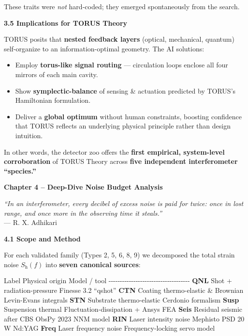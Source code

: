 \documentclass[]{article}
\newcommand{\subscript}[1]{\ensuremath{_{\mathrm{#1}}}}
\begin{document}
These traits were \emph{not} hard-coded; they emerged spontaneously from
the search.

\textbf{3.5 Implications for TORUS Theory}

TORUS posits that \textbf{nested feedback layers} (optical, mechanical,
quantum) self-organize to an information-optimal geometry. The AI
solutions:

\begin{itemize}
\item
  Employ \textbf{torus-like signal routing} --- circulation loops
  enclose all four mirrors of each main cavity.
\item
  Show \textbf{symplectic-balance} of sensing \& actuation predicted by
  TORUS's Hamiltonian formulation.
\item
  Deliver a \textbf{global optimum} without human constraints, boosting
  confidence that TORUS reflects an underlying physical principle rather
  than design intuition.
\end{itemize}

In other words, the detector zoo offers the \textbf{first empirical,
system-level corroboration} of TORUS Theory across \textbf{five
independent interferometer ``species.''}

\textbf{Chapter 4 -- Deep-Dive Noise Budget Analysis}

\emph{``In an interferometer, every decibel of excess noise is paid for
twice: once in lost range, and once more in the observing time it
steals.''}\\
--- R. X. Adhikari

\textbf{4.1 Scope and Method}

For each validated family (Types 2, 5, 6, 8, 9) we decomposed the total
strain noise $S\subscript{h}(f)$ into \textbf{seven canonical
sources}:

\textbar{} Label \textbar{} Physical origin \textbar{} Model / tool
\textbar{}
\textbar{}-\/-\/-\/-\/-\/-\textbar{}-\/-\/-\/-\/-\/-\/-\/-\/-\/-\/-\/-\/-\/-\/-\/-\/-\textbar{}-\/-\/-\/-\/-\/-\/-\/-\/-\/-\/-\/-\/-\textbar{}
\textbar{} \textbf{QNL} \textbar{} Shot + radiation-pressure \textbar{}
Finesse 3.2 ``qshot'' \textbar{} \textbar{} \textbf{CTN} \textbar{}
Coating thermo-elastic \& Brownian \textbar{} Levin-Evans integrals
\textbar{} \textbar{} \textbf{STN} \textbar{} Substrate thermo-elastic
\textbar{} Cerdonio formalism \textbar{} \textbar{} \textbf{Susp}
\textbar{} Suspension thermal \textbar{} Fluctuation-dissipation + Ansys
FEA \textbar{} \textbar{} \textbf{Seis} \textbar{} Residual seismic
after CBS \textbar{} ObsPy 2023 NNM model \textbar{} \textbar{}
\textbf{RIN} \textbar{} Laser intensity noise \textbar{} Mephisto PSD 20
W Nd:YAG \textbar{} \textbar{} \textbf{Freq} \textbar{} Laser frequency
noise \textbar{} Frequency-locking servo model \textbar{}
\end{document}
